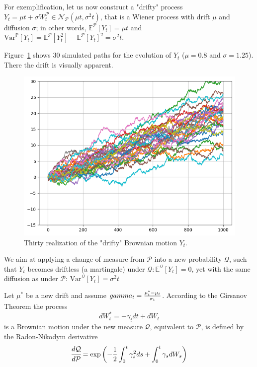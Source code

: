 \documentclass[12pt,a4paper]{article}
\begin{document}
For exemplification, let us now construct a "drifty" process $Y_t=\mu t+\sigma W_t^{\mathcal{P}}\in \mathcal{N}_{\mathcal{P}}(\mu t, \sigma^2 t)$, that is a Wiener process with drift $\mu$ and diffusion $\sigma$; in other words, $\mathbb{E}^{\mathcal{P}}[Y_t]=\mu t$ and $\text{Var}^{\mathbb{P}}[Y_t]=\mathbb{E}^{\mathcal{P}}[Y^2_t]-\mathbb{E}^{\mathcal{P}}[Y_t]^2=\sigma^2 t$.

Figure~\ref{fig:brownian_motion_drift} shows 30 simulated paths for the evolution of $Y_t$ ($\mu = 0.8$ and $\sigma =1.25$). There the drift is visually apparent.
\begin{figure}[htbp]
\begin{center}
	\includegraphics[width=0.5\linewidth]{addons/brownian_motion_drift}
\end{center}
\label{fig:brownian_motion_drift}
	\caption{Thirty realization of the "drifty" Brownian motion $Y_t$.}
\end{figure}

We aim at applying a change of measure from $\mathcal{P}$ into a new probability $\mathcal{Q}$, such that $Y_t$ becomes driftless (a martingale) under $\mathcal{Q}: \mathbb{E}^{\mathcal{Q}}[Y_t]=0$, yet with the same diffusion as under $\mathcal{P}$: $\text{Var}^{\mathcal{Q}}[Y_t]=\sigma^2 t$

Let $\mu^{*}$ be a new drift and assume $\\gamma_t = \frac{\mu_t^{*}-\mu_t}{\sigma_t}$. According to the Girsanov Theorem the process
\begin{equation}
dW^{*}_t = -\gamma_t dt + dW_t
\end{equation}
is a Brownian motion under the new measure $\mathcal{Q}$, equivalent to $\mathcal{P}$, is defined by the Radon-Nikodym derivative
\begin{equation}
\cfrac{d\mathcal{Q}}{d\mathcal{P}} = \exp\left(-\frac{1}{2}\int_0^t\gamma_s^2 ds + \int_0^t\gamma_s dW_s\right)
\end{equation}
\end{document}
